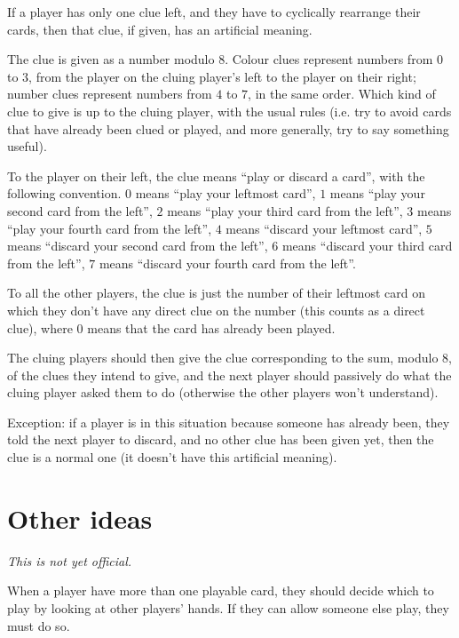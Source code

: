 \documentclass[a4paper]{article}
\theoremstyle{plain}
\theoremstyle{definition}
\begin{document}
If a player has only one clue left, and they have to cyclically rearrange their cards, then that clue, if given, has an artificial meaning.

The clue is given as a number modulo 8. Colour clues represent numbers from $0$ to $3$, from the player on the cluing player's left to the player on their right; number clues represent numbers from $4$ to $7$, in the same order. Which kind of clue to give is up to the cluing player, with the usual rules (i.e. try to avoid cards that have already been clued or played, and more generally, try to say something useful). 

To the player on their left, the clue means ``play or discard a card'', with the following convention. $0$ means ``play your leftmost card'', $1$ means ``play your second card from the left'', $2$ means ``play your third card from the left'', $3$ means ``play your fourth card from the left'', $4$ means ``discard your leftmost card'', $5$ means ``discard your second card from the left'', $6$ means ``discard your third card from the left'', $7$ means ``discard your fourth card from the left''.

To all the other players, the clue is just the number of their leftmost card on which they don't have any direct clue on the number (this counts as a direct clue), where $0$ means that the card has already been played.

The cluing players should then give the clue corresponding to the sum, modulo 8, of the clues they intend to give, and the next player should passively do what the cluing player asked them to do (otherwise the other players won't understand).

Exception: if a player is in this situation because someone has already been, they told the next player to discard, and no other clue has been given yet, then the clue is a normal one (it doesn't have this artificial meaning).

\section{Other ideas}

\textit{This is not yet official.}

When a player have more than one playable card, they should decide which to play by looking at other players' hands. If they can allow someone else play, they must do so.
\end{document}
